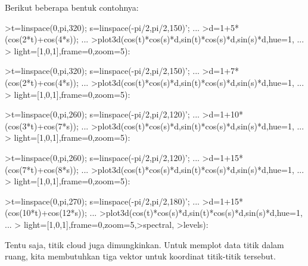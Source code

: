 \documentclass{article}
\begin{document}
\begin{eulernotebook}
\begin{eulercomment}
Berikut beberapa bentuk contohnya:
\end{eulercomment}
\begin{eulerprompt}
>t=linspace(0,pi,320); s=linspace(-pi/2,pi/2,150)'; ...
>d=1+5*(cos(2*t)+cos(4*s)); ...
>plot3d(cos(t)*cos(s)*d,sin(t)*cos(s)*d,sin(s)*d,hue=1, ...
>  light=[1,0,1],frame=0,zoom=5):
\end{eulerprompt}
\begin{eulerprompt}
>t=linspace(0,pi,320); s=linspace(-pi/2,pi/2,150)'; ...
>d=1+7*(cos(2*t)+cos(4*s)); ...
>plot3d(cos(t)*cos(s)*d,sin(t)*cos(s)*d,sin(s)*d,hue=1, ...
>  light=[1,0,1],frame=0,zoom=5):
\end{eulerprompt}
\begin{eulerprompt}
>t=linspace(0,pi,260); s=linspace(-pi/2,pi/2,120)'; ...
>d=1+10*(cos(3*t)+cos(7*s)); ...
>plot3d(cos(t)*cos(s)*d,sin(t)*cos(s)*d,sin(s)*d,hue=1, ...
>  light=[1,0,1],frame=0,zoom=5):
\end{eulerprompt}
\begin{eulerprompt}
>t=linspace(0,pi,260); s=linspace(-pi/2,pi/2,120)'; ...
>d=1+15*(cos(7*t)+cos(8*s)); ...
>plot3d(cos(t)*cos(s)*d,sin(t)*cos(s)*d,sin(s)*d,hue=1, ...
>  light=[1,0,1],frame=0,zoom=5):
\end{eulerprompt}
\begin{eulerprompt}
>t=linspace(0,pi,270); s=linspace(-pi/2,pi/2,180)'; ...
>d=1+15*(cos(10*t)+cos(12*s)); ...
>plot3d(cos(t)*cos(s)*d,sin(t)*cos(s)*d,sin(s)*d,hue=1, ...
>  light=[1,0,1],frame=0,zoom=5,>spectral, >levels):
\end{eulerprompt}
\begin{eulercomment}
Tentu saja, titik cloud juga dimungkinkan. Untuk memplot data titik
dalam ruang, kita membutuhkan tiga vektor untuk koordinat titik-titik
tersebut.


\end{eulercomment}
\end{eulernotebook}
\end{document}
